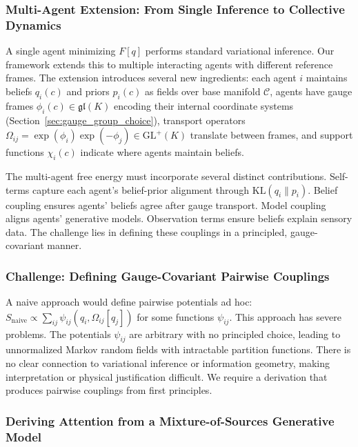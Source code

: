 \documentclass[11pt]{article}
\begin{document}
\subsubsection{Multi-Agent Extension: From Single Inference to Collective Dynamics}

A single agent minimizing $F[q]$ performs standard variational inference. Our framework extends this to multiple interacting agents with different reference frames. The extension introduces several new ingredients: each agent $i$ maintains beliefs $q_i(c)$ and priors $p_i(c)$ as fields over base manifold $\mathcal{C}$, agents have gauge frames $\phi_i(c) \in \mathfrak{gl}(K)$ encoding their internal coordinate systems (Section~\ref{sec:gauge_group_choice}), transport operators $\Omega_{ij} = \exp(\phi_i)\exp(-\phi_j) \in \mathrm{GL}^+(K)$ translate between frames, and support functions $\chi_i(c)$ indicate where agents maintain beliefs.

The multi-agent free energy must incorporate several distinct contributions. Self-terms capture each agent's belief-prior alignment through $\mathrm{KL}(q_i \| p_i)$. Belief coupling ensures agents' beliefs agree after gauge transport. Model coupling aligns agents' generative models. Observation terms ensure beliefs explain sensory data. The challenge lies in defining these couplings in a principled, gauge-covariant manner.

\subsubsection{Challenge: Defining Gauge-Covariant Pairwise Couplings}

A naive approach would define pairwise potentials ad hoc: $S_{\text{naive}} \propto \sum_{ij} \psi_{ij}(q_i, \Omega_{ij}[q_j])$ for some functions $\psi_{ij}$. This approach has severe problems. The potentials $\psi_{ij}$ are arbitrary with no principled choice, leading to unnormalized Markov random fields with intractable partition functions. There is no clear connection to variational inference or information geometry, making interpretation or physical justification difficult. We require a derivation that produces pairwise couplings from first principles.

\subsubsection{Deriving Attention from a Mixture-of-Sources Generative Model}
\label{sec:mixture_derivation}
\end{document}
